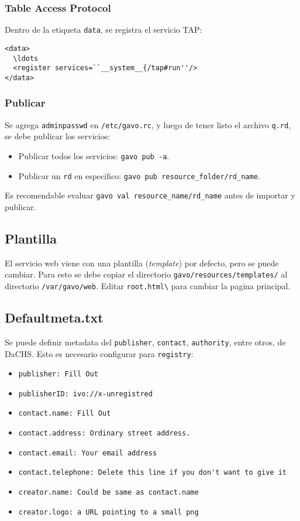 \subsubsection*{Table Access Protocol}

Dentro de la etiqueta \verb;data;, se registra el servicio TAP:

\begin{verbatim}
<data>
  \ldots
  <register services=``__system__{/tap#run''/>
</data>
\end{verbatim}

\subsubsection*{Publicar}

Se agrega \verb;adminpasswd; en \verb;/etc/gavo.rc;, y luego de tener listo el archivo \verb;q.rd;, se debe publicar los servicios:

\begin{itemize}
	\item Publicar todos los servicios: \verb;gavo pub -a;.
	\item Publicar un \verb;rd; en específico: \verb;gavo pub resource_folder/rd_name;.
\end{itemize}

Es recomendable evaluar \verb;gavo val resource_name/rd_name; antes de importar y publicar.

\subsection*{Plantilla}

El servicio web viene con una plantilla (\emph{template}) por defecto, pero se puede cambiar. Para esto se debe copiar el directorio \verb;gavo/resources/templates/; al directorio \verb;/var/gavo/web;. Editar \verb;root.html\; para cambiar la pagina principal.

\subsection*{Defaultmeta.txt}

Se puede definir metadata del \verb;publisher;, \verb;contact;, \verb;authority;, entre otros, de DaCHS. Esto es necesario configurar para \verb;registry;:

\begin{itemize}
	\item \verb;publisher: Fill Out;
	\item \verb;publisherID: ivo://x-unregistred;
	\item \verb;contact.name: Fill Out;
	\item \verb;contact.address: Ordinary street address.;
	\item \verb;contact.email: Your email address;
	\item \verb;contact.telephone: Delete this line if you don't want to give it;
	\item \verb;creator.name: Could be same as contact.name;
	\item \verb;creator.logo: a URL pointing to a small png;
\end{itemize}

